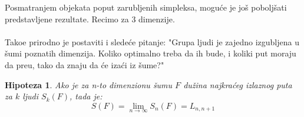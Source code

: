 \documentclass[b1paper,portrait]{template/baposter}
\newtheorem*{hipoteza}{Hipoteza}
\begin{document}
\begin{poster}
{
	Posmatranjem objekata poput zarubljenih simpleksa, mogu\' ce je jo\v s pobolj\v sati predstavljene rezultate. Recimo za 3 dimenzije.\\ \\
	Tako\dj e prirodno je postaviti i slede\' ce pitanje:
	"Grupa ljudi je zajedno izgubljena u \v sumi poznatih dimenzija. Koliko optimalno treba da ih bude,
	i koliki put moraju da pre\dj u, tako da znaju da \' ce iza\' ci iz \v sume?"
	\begin{hipoteza}
		Ako je za n-to dimenzionu \v sumu $F$ du\v zina najkra\' ceg izlaznog puta za $k$ ljudi $S_k(F)$, tada je:
		$$S(F)=\lim_{n \to \infty} S_n(F) = L_{n,n+1}$$
	\end{hipoteza}
	\vspace{0.15cm}
}

\end{poster}
\end{document}
